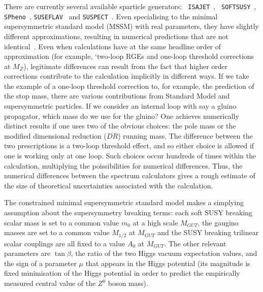 \documentclass[final,3p,times,pdflatex]{elsarticle}
\begin{document}
There are currently several available sparticle generators: {\tt
  ISAJET}~\cite{Paige:2003mg}, {\tt 
  SOFTSUSY}~\cite{Allanach:2001kg,Allanach:2009bv,Allanach:2011de,Allanach:2013kza}, 
{\tt SPheno}~\cite{Porod:2003um},
{\tt SUSEFLAV}~\cite{Chowdhury:2011zr} and
{\tt SUSPECT}~\cite{Djouadi:2002ze}. Even specialising to the minimal
supersymmetric standard model (MSSM) with real parameters, 
they have slightly different
approximations, resulting in numerical predictions that are not
identical~\cite{Allanach:2003jw,Allanach:2004rh,Belanger:2005jk}. 
Even when calculations have at the same headline order of approximation (for
example, `two-loop RGEs and one-loop threshold corrections at $M_Z$),
legitimate differences can result from the fact that higher order corrections
contribute to the calculation implicitly in different ways. 
If we take the example of a one-loop threshold correction to, for example, 
the prediction of the stop mass, there are various contributions from Standard
Model and supersymmetric particles. If we consider an internal loop with
say a gluino propagator, which mass do we use for the gluino? One achieves
numerically distinct results if one uses two of the obvious choices: the
pole mass or the modified dimensional reduction ($\overline{DR}$) running
mass. The difference between the two prescriptions is a two-loop threshold
effect, and so either choice is allowed if one is working only at one loop.
Such choices occur hundreds of times within the calculation, multiplying the
poissibilities for numerical differences. Thus, the numerical differences
between the spectrum calculators gives a rough estimate of the size of
theoretical uncertainties associated with the calculation. 

The constrained minimal supersymmetric standard model makes a simplying
assumption about the supersymmetry breaking terms: each soft SUSY breaking
scalar mass is set to a common value $m_0$ at a high scale $M_{GUT}$, the
gaugino masses are set to a common value $M_{1/2}$ at $M_{GUT}$ and the 
SUSY breaking trilinear scalar couplings are all fixed to a value $A_0$ at
$M_{GUT}$. The other relevant parameters are $\tan \beta$, the ratio of the
two Higgs vacuum expectation values, and the sign of a parameter $\mu$ that
appears in the Higgs potential (its magnitude is fixed minimisation of the
Higgs potential in order to predict the empirically measured central value of
the $Z^0$ boson mass).
\end{document}
